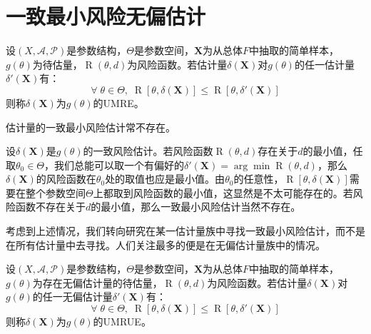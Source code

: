 \section{一致最小风险无偏估计}

\begin{definition}
	设$(X,\mathscr{A},\mathscr{P})$是参数结构，$\Theta$是参数空间，$\mathbf{X}$为从总体$F$中抽取的简单样本，$g(\theta)$为待估量，$\operatorname{R}(\theta,d)$为风险函数。若估计量$\delta(\mathbf{X})$对$g(\theta)$的任一估计量$\delta'(\mathbf{X})$有：
	\begin{equation*}
		\forall\;\theta\in\Theta,\;\operatorname{R}[\theta,\delta(\mathbf{X})]\leqslant\operatorname{R}[\theta,\delta'(\mathbf{X})]
	\end{equation*}
	则称$\delta(\mathbf{X})$为$g(\theta)$的\gls{UMRE}。
\end{definition}
\begin{note}
	估计量的一致最小风险估计常不存在。\par
	设$\delta(\mathbf{X})$是$g(\theta)$的一致风险估计。若风险函数$\operatorname{R}(\theta,d)$存在关于$d$的最小值，任取$\theta_0\in\Theta$，我们总能可以取一个有偏好的$\delta'(\mathbf{X})=\arg\min\operatorname{R}(\theta,d)$，那么$\delta(\mathbf{X})$的风险函数在$\theta_0$处的取值也应是最小值。由$\theta_0$的任意性，$\operatorname{R}[\theta,\delta(\mathbf{X})]$需要在整个参数空间$\Theta$上都取到风险函数的最小值，这显然是不太可能存在的。若风险函数不存在关于$d$的最小值，那么一致最小风险估计当然不存在。\par
	考虑到上述情况，我们转向研究在某一估计量族中寻找一致最小风险估计，而不是在所有估计量中去寻找。人们关注最多的便是在无偏估计量族中的情况。
\end{note}
\begin{definition}
	设$(X,\mathscr{A},\mathscr{P})$是参数结构，$\Theta$是参数空间，$\mathbf{X}$为从总体$F$中抽取的简单样本，$g(\theta)$为存在无偏估计量的待估量，$\operatorname{R}(\theta,d)$为风险函数。若估计量$\delta(\mathbf{X})$对$g(\theta)$的任一无偏估计量$\delta'(\mathbf{X})$有：
	\begin{equation*}
		\forall\;\theta\in\Theta,\;\operatorname{R}[\theta,\delta(\mathbf{X})]\leqslant\operatorname{R}[\theta,\delta'(\mathbf{X})]
	\end{equation*}
	则称$\delta(\mathbf{X})$为$g(\theta)$的\gls{UMRUE}。
\end{definition}
